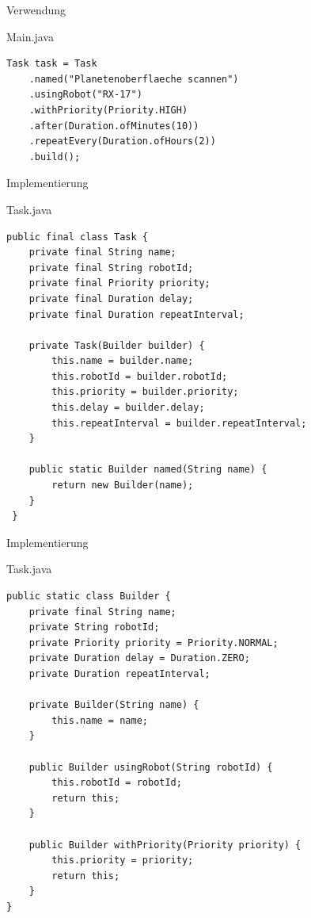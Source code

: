 \begin{frame}[fragile]{Verwendung}
	\begin{exampleblock}{Main.java}
		\begin{lstlisting}
Task task = Task
    .named("Planetenoberflaeche scannen")
    .usingRobot("RX-17")
    .withPriority(Priority.HIGH)
    .after(Duration.ofMinutes(10))
    .repeatEvery(Duration.ofHours(2))
    .build();		
		\end{lstlisting}
	\end{exampleblock}
\end{frame}

\begin{frame}[fragile]{Implementierung}
	\begin{exampleblock}{Task.java}
		\begin{lstlisting}[basicstyle=\tiny]
public final class Task {
    private final String name;
    private final String robotId;
    private final Priority priority;
    private final Duration delay;
    private final Duration repeatInterval;

    private Task(Builder builder) {
        this.name = builder.name;
        this.robotId = builder.robotId;
        this.priority = builder.priority;
        this.delay = builder.delay;
        this.repeatInterval = builder.repeatInterval;
    }

    public static Builder named(String name) {
        return new Builder(name);
    }
 }
		\end{lstlisting}
	\end{exampleblock}
\end{frame}

\begin{frame}[fragile]{Implementierung}
	\begin{exampleblock}{Task.java}
		\begin{lstlisting}[basicstyle=\tiny]
public static class Builder {
    private final String name;
    private String robotId;
    private Priority priority = Priority.NORMAL;
    private Duration delay = Duration.ZERO;
    private Duration repeatInterval;

    private Builder(String name) {
        this.name = name;
    }

    public Builder usingRobot(String robotId) {
        this.robotId = robotId;
        return this;
    }

    public Builder withPriority(Priority priority) {
        this.priority = priority;
        return this;
    }
}
		\end{lstlisting}
	\end{exampleblock}
\end{frame}